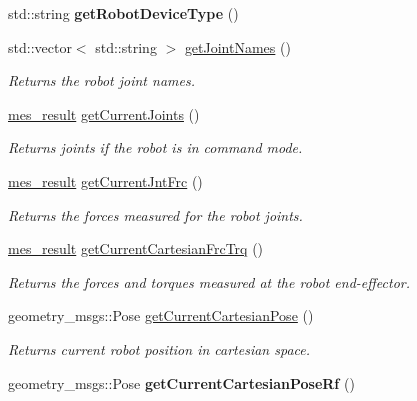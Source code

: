 \begin{DoxyCompactItemize}
\item 
\hypertarget{classkukadu_1_1KukieControlQueue_ad62cd51305bd1ac8b5da9629b7f3116f}{std\-::string {\bfseries get\-Robot\-Device\-Type} ()}\label{classkukadu_1_1KukieControlQueue_ad62cd51305bd1ac8b5da9629b7f3116f}

\item 
std\-::vector$<$ std\-::string $>$ \hyperlink{classkukadu_1_1KukieControlQueue_af3c7ff340cd44a44233c209eeed9d929}{get\-Joint\-Names} ()
\begin{DoxyCompactList}\small\item\em Returns the robot joint names. \end{DoxyCompactList}\item 
\hyperlink{structmes__result}{mes\-\_\-result} \hyperlink{classkukadu_1_1KukieControlQueue_aecf704318e729f49999d3be51262f068}{get\-Current\-Joints} ()
\begin{DoxyCompactList}\small\item\em Returns joints if the robot is in command mode. \end{DoxyCompactList}\item 
\hyperlink{structmes__result}{mes\-\_\-result} \hyperlink{classkukadu_1_1KukieControlQueue_a947d5f2d42060bdd6d7271d80ac40e7a}{get\-Current\-Jnt\-Frc} ()
\begin{DoxyCompactList}\small\item\em Returns the forces measured for the robot joints. \end{DoxyCompactList}\item 
\hyperlink{structmes__result}{mes\-\_\-result} \hyperlink{classkukadu_1_1KukieControlQueue_af9999c0af6059520452f0d42a8db4527}{get\-Current\-Cartesian\-Frc\-Trq} ()
\begin{DoxyCompactList}\small\item\em Returns the forces and torques measured at the robot end-\/effector. \end{DoxyCompactList}\item 
geometry\-\_\-msgs\-::\-Pose \hyperlink{classkukadu_1_1KukieControlQueue_ab13290e3512b3a1ab10660b0f60e6961}{get\-Current\-Cartesian\-Pose} ()
\begin{DoxyCompactList}\small\item\em Returns current robot position in cartesian space. \end{DoxyCompactList}\item 
\hypertarget{classkukadu_1_1KukieControlQueue_a4ecef16deac6daa191d942cf00526550}{geometry\-\_\-msgs\-::\-Pose {\bfseries get\-Current\-Cartesian\-Pose\-Rf} ()}\label{classkukadu_1_1KukieControlQueue_a4ecef16deac6daa191d942cf00526550}


\end{DoxyCompactItemize}
